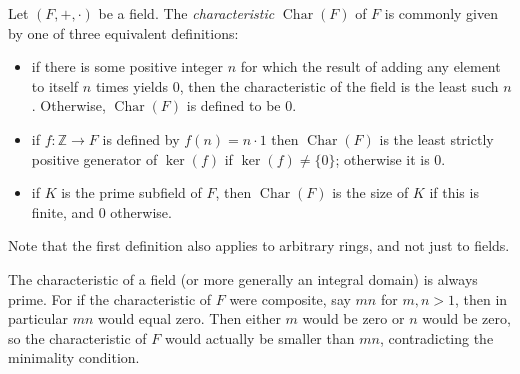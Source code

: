 \documentclass{article}
\DeclareMathOperator{\cha}{Char}
\begin{document}
Let $(F,+,\cdot)$ be a field.  The \emph{characteristic} $\cha(F)$ of $F$ is commonly given by one of three equivalent definitions:

\begin{itemize}
\item
if there is some positive integer $n$ for which the result of adding any element to itself $n$ times yields $0$, then the characteristic of the field is the least such $n$.  Otherwise, $\cha(F)$ is defined to be $0$.
\item
if $f:\mathbb{Z}\to F$ is defined by $f(n) = n\cdot 1$ then $\cha(F)$ is the least strictly positive generator of $\operatorname{ker}(f)$ if $\operatorname{ker}(f)\neq \{ 0\}$; otherwise it is $0$.
\item
if $K$ is the prime subfield of $F$, then $\cha(F)$ is the size of $K$ if this is finite, and $0$ otherwise.
\end{itemize}

Note that the first definition also applies to arbitrary rings, and not just to fields.

The characteristic of a field (or more generally an integral domain) is always prime.  For if the characteristic of $F$ were composite, say $mn$ for $m,n>1$, then in particular $mn$ would equal zero.  Then either $m$ would be zero or $n$ would be zero, so the characteristic of $F$ would actually be smaller than $mn$, contradicting the minimality condition.
\end{document}
